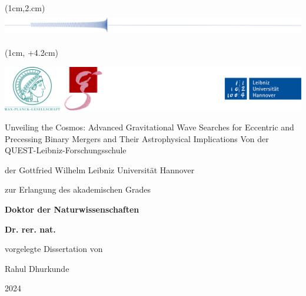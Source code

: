 \begin{titlepage}
\begin{center}
\begin{textblock*}{5cm}(1cm,2.cm) %
        \includegraphics[width=19cm,height=1cm]{figures/Introduction/title-WF.png} %
\end{textblock*}

\begin{textblock*}{5cm}(1cm, \textheight+4.2cm) %
\end{textblock*}





\includegraphics[width=\textwidth]{assets/logo_band_2.png}\par
\vspace{2cm}

{\Large{\textcolor{mycolor}{Unveiling the Cosmos}: Advanced Gravitational Wave Searches for Eccentric and Precessing Binary Mergers and Their Astrophysical Implications
}}
\vfill
Von der QUEST-Leibniz-Forschungsschule\par
der Gottfried Wilhelm Leibniz Universität Hannover\par
\vspace{1cm}
zur Erlangung des akademischen Grades\par
\textbf{Doktor der Naturwissenschaften}\par
\textbf{Dr. rer. nat.}\par
\vspace{1cm}
vorgelegte Dissertation von\par
\vfill
{\Large{Rahul Dhurkunde}}\par
\vfill
{\Large{2024}}
\end{center}
\end{titlepage}
\clearpage
\thispagestyle{empty}
